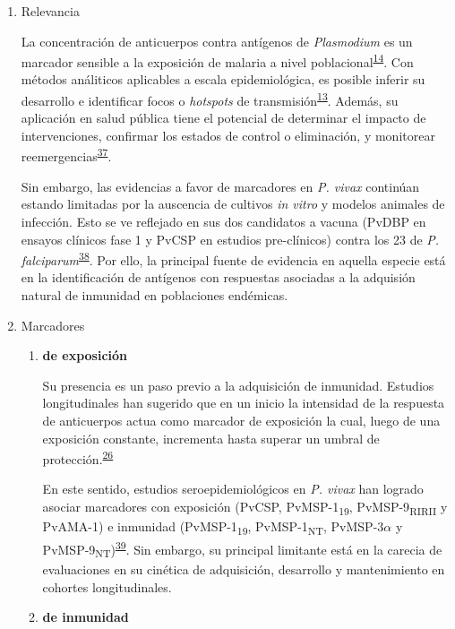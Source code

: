 \documentclass[]{article}
\begin{document}
\begin{enumerate}
\def\labelenumi{\alph{enumi}.}
\item
  Relevancia

  La concentración de anticuerpos contra antígenos de \emph{Plasmodium}
  es un marcador sensible a la exposición de malaria a nivel
  poblacional\textsuperscript{\protect\hyperlink{ref-elliott2014}{14}}.
  Con métodos análiticos aplicables a escala epidemiológica, es posible
  inferir su desarrollo e identificar focos o \emph{hotspots} de
  transmisión\textsuperscript{\protect\hyperlink{ref-hotspots2015}{13}}.
  Además, su aplicación en salud pública tiene el potencial de
  determinar el impacto de intervenciones, confirmar los estados de
  control o eliminación, y monitorear
  reemergencias\textsuperscript{\protect\hyperlink{ref-sepulveda2015}{37}}.

  Sin embargo, las evidencias a favor de marcadores en \emph{P. vivax}
  continúan estando limitadas por la auscencia de cultivos \emph{in
  vitro} y modelos animales de infección. Esto se ve reflejado en sus
  dos candidatos a vacuna (PvDBP en ensayos clínicos fase 1 y PvCSP en
  estudios pre-clínicos) contra los 23 de \emph{P.
  falciparum}\textsuperscript{\protect\hyperlink{ref-rainbow2016}{38}}.
  Por ello, la principal fuente de evidencia en aquella especie está en
  la identificación de antígenos con respuestas asociadas a la adquisión
  natural de inmunidad en poblaciones endémicas.
\item
  Marcadores

  \begin{enumerate}
  \def\labelenumii{\roman{enumii}.}
  \item
    \textbf{de exposición}

    Su presencia es un paso previo a la adquisición de inmunidad.
    Estudios longitudinales han sugerido que en un inicio la intensidad
    de la respuesta de anticuerpos actua como marcador de exposición la
    cual, luego de una exposición constante, incrementa hasta superar un
    umbral de
    protección.\textsuperscript{\protect\hyperlink{ref-Stanisic2015}{26}}

    En este sentido, estudios seroepidemiológicos en \emph{P. vivax} han
    logrado asociar marcadores con exposición (PvCSP,
    PvMSP-1\textsubscript{19}, PvMSP-9\textsubscript{RIRII} y PvAMA-1) e
    inmunidad (PvMSP-1\textsubscript{19}, PvMSP-1\textsubscript{NT},
    PvMSP-3\(\alpha\) y
    PvMSP-9\textsubscript{NT})\textsuperscript{\protect\hyperlink{ref-cutts2014meta}{39}}.
    Sin embargo, su principal limitante está en la carecia de
    evaluaciones en su cinética de adquisición, desarrollo y
    mantenimiento en cohortes longitudinales. 
  \item
    \textbf{de inmunidad}


\end{enumerate}
\end{enumerate}
\end{document}
